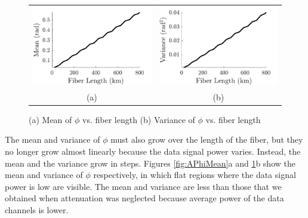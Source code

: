 %
\begin{figure}[htb]
	\begin{tabular}{c c}
		\includegraphics[width=0.5\linewidth]{img/APhiMean} & \includegraphics[width=0.5\linewidth]{img/APhiVar} \\
		(a) & (b)
	\end{tabular}
	\caption{(a)\label{fig:APhiMean} Mean of $\phi$ vs. fiber length (b)\label{fig:APhiVar} Variance of $\phi$ vs. fiber length}
\end{figure}
%
The mean and variance of $\phi$ must also grow over the length of the fiber, but they no longer grow almost linearly because the data signal power varies. Instead, the mean and the variance grow in steps. Figures \ref{fig:APhiMean}a and \ref{fig:APhiVar}b show the mean and variance of $\phi$ respectively, in which flat regions where the data signal power is low are visible. The mean and variance are less than those that we obtained when attenuation was neglected because average power of the data channels is lower.

